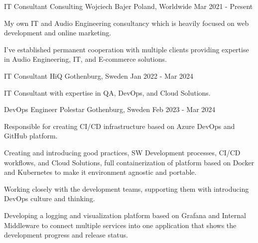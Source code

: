 
\begin{cventries}

  \cventry
  {IT Consultant} %
  {Consulting Wojciech Bajer} %
  {Poland, Worldwide} %
  {Mar 2021 - Present} %
  {
    \begin{cvitems} %
      \item {My own IT and Audio Engineering consultancy which is heavily focused on web development and online marketing.}
      \item {I've established permanent cooperation with multiple clients providing expertise in Audio Engineering, IT, and E-commerce solutions.}
    \end{cvitems}
  }

  \cventry
  {IT Consultant} %
  {HiQ} %
  {Gothenburg, Sweden} %
  {Jan 2022 - Mar 2024} %
  {
    \begin{cvitems}
      \item {IT Consultant with expertise in QA, DevOps, and Cloud Solutions.}
    \end{cvitems}
  }

  \cventry
  {DevOps Engineer} %
  {Polestar} %
  {Gothenburg, Sweden} %
  {Feb 2023 - Mar 2024} %
  {
    \begin{cvitems} %
      \item {Responsible for creating CI/CD infrastructure based on Azure DevOps and GitHub platform.}
      \item {Creating and introducing good practices, SW Development processes, CI/CD workflows, and Cloud Solutions, full containerization of platform based on Docker and Kubernetes to make it environment agnostic and portable.}
      \item {Working closely with the development teams, supporting them with introducing DevOps culture and thinking.}
      \item {Developing a logging and visualization platform based on Grafana and Internal Middleware to connect multiple services into one application that shows the development progress and release status.}
    \end{cvitems}
  }


\end{cventries}

